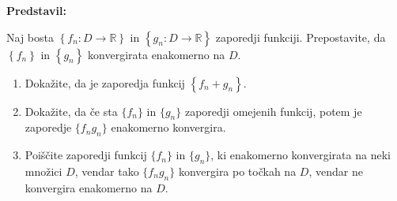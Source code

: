 \textbf{Predstavil: }

Naj bosta $\left\{ f_{n} : D \to \mathbb{R}\right\}$ in $\left\{ g_{n}: D \to \mathbb{R}\right\}$ zaporedji funkciji. Prepostavite, da $\left\{ f_{n}\right\}$ in $\left\{ g_{n}\right\}$ konvergirata enakomerno na $D$.  
\begin{enumerate}
  \item Dokažite, da je zaporedja funkcij $\left\{ f_{n} + g_{n} \right\}$.
  \item Dokažite, da če sta $\{f_{n}\}$ in $\{g_{n}\} $ zaporedji omejenih funkcij, potem je zaporedje $\{f_{n}g_{n}\}$ enakomerno konvergira.
  \item Poiščite zaporedji funkcij $\{f_{n}\}$ in $\{g_{n}\}$, ki enakomerno konvergirata na neki množici $D$, vendar tako $\{f_{n} g_{n}\}$ konvergira po točkah na $D$, vendar ne konvergira enakomerno na $D$.  
\end{enumerate}